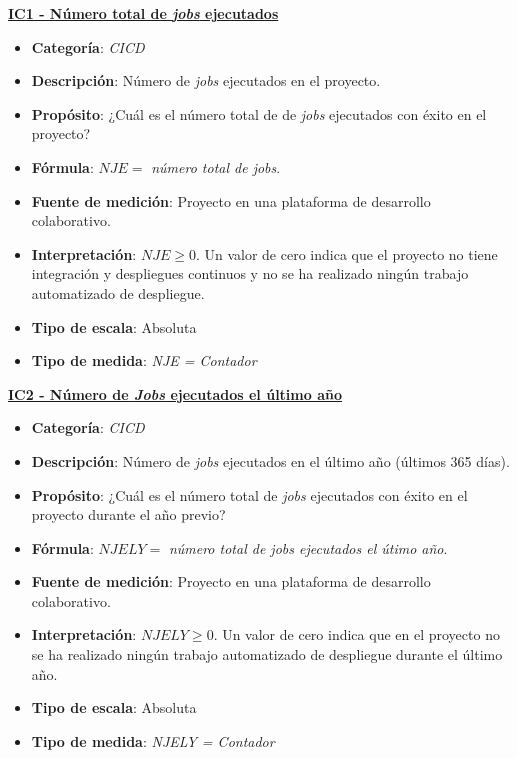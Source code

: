 \textbf{\underline{IC1 - Número total de \textit{jobs} ejecutados}}
\begin{itemize}
	\item \textbf{Categoría}: \textit{CICD}
	\item \textbf{Descripción}: Número de \textit{jobs} ejecutados en el proyecto.
	\item \textbf{Propósito}: ¿Cuál es el número total de de \textit{jobs} ejecutados con éxito en el proyecto?
	\item \textbf{Fórmula}: $NJE =$ \textit{número total de jobs}.
	\item \textbf{Fuente de medición}: Proyecto en una plataforma de desarrollo colaborativo.
	\item \textbf{Interpretación}: $NJE \geq 0$. Un valor de cero indica que el proyecto no tiene integración y despliegues continuos y no se ha realizado ningún trabajo automatizado de despliegue.
	\item \textbf{Tipo de escala}: Absoluta
	\item \textbf{Tipo de medida}: \textit{NJE = Contador}
\end{itemize}

\textbf{\underline{IC2 - Número de \textit{Jobs} ejecutados el último año}}
\begin{itemize}
	\item \textbf{Categoría}: \textit{CICD}
	\item \textbf{Descripción}: Número de \textit{jobs} ejecutados en el último año (últimos 365 días).
	\item \textbf{Propósito}: ¿Cuál es el número total de \textit{jobs} ejecutados con éxito en el proyecto durante el año previo?
	\item \textbf{Fórmula}: $NJELY =$ \textit{número total de jobs ejecutados el útimo año}.
	\item \textbf{Fuente de medición}: Proyecto en una plataforma de desarrollo colaborativo.
	\item \textbf{Interpretación}: $NJELY \geq 0$. Un valor de cero indica que en el proyecto no se ha realizado ningún trabajo automatizado de despliegue durante el último año.
	\item \textbf{Tipo de escala}: Absoluta
	\item \textbf{Tipo de medida}: \textit{NJELY = Contador}
\end{itemize}

